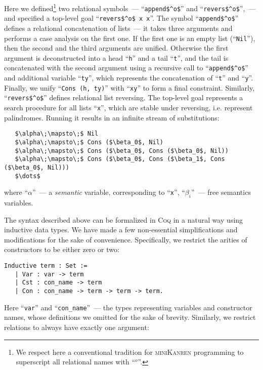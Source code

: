 Here we defined\footnote{We respect here a conventional tradition for \textsc{miniKanren} programming to superscript all relational names with ``$^o$''.}
two relational symbols~--- ``\lstinline|append$^o$|'' and ``\lstinline|revers$^o$|'',~--- and specified a top-level goal ``\lstinline|revers$^o$ x x|''.
The symbol ``\lstinline|append$^o$|'' defines a relational concatenation of lists~--- it takes three arguments and performs a case analysis on the first one. If the
first one is an empty list (``\lstinline|Nil|''), then the second and the third arguments are unified. Otherwise the first argument is deconstructed into a head ``\lstinline|h|''
and a tail ``\lstinline|t|'', and the tail is concatenated with the second argument using a recursive call to ``\lstinline|append$^o$|'' and additional variable ``\lstinline|ty|'', which
represents the concatenation of ``\lstinline|t|'' and ``\lstinline|y|''. Finally, we unify ``\lstinline|Cons (h, ty)|'' with ``\lstinline|xy|'' to form a final constraint. Similarly,
``\lstinline|revers$^o$|'' defines relational list reversing. The top-level goal represents a search procedure for all lists ``\lstinline|x|'', which are stable under reversing, i.e.
represent palindromes. Running it results in an infinite stream of substitutions:

\begin{lstlisting}
   $\alpha\;\mapsto\;$ Nil
   $\alpha\;\mapsto\;$ Cons ($\beta_0$, Nil)
   $\alpha\;\mapsto\;$ Cons ($\beta_0$, Cons ($\beta_0$, Nil))
   $\alpha\;\mapsto\;$ Cons ($\beta_0$, Cons ($\beta_1$, Cons ($\beta_0$, Nil)))
   $\dots$
\end{lstlisting}

where ``$\alpha$''~--- a \emph{semantic} variable, corresponding to ``\lstinline|x|'', ``$\beta_i$''~--- free semantics variables.

The syntax described above can be formalized in \textsc{Coq} in a natural way using inductive data types. We have made a few non-essential simplifications and modifications for the sake of convenience.
Specifically, we restrict the arities of constructors to be either zero or two:

\begin{lstlisting}[language=Coq,basicstyle=\footnotesize]
   Inductive term : Set :=
   | Var : var -> term
   | Cst : con_name -> term
   | Con : con_name -> term -> term -> term.
\end{lstlisting}

Here ``\lstinline[language=Coq]{var}'' and ``\lstinline[language=Coq]{con_name}''~--- the types representing variables and constructor names, whose definitions we omitted for the sake of brevity.
Similarly, we restrict relations to always have exactly one argument:

